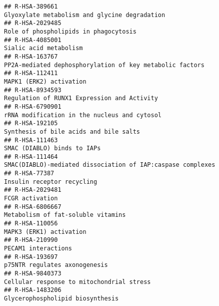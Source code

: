 \documentclass[
]{article}
\begin{document}
\begin{verbatim}
## R-HSA-389661                                                                                         Glyoxylate metabolism and glycine degradation
## R-HSA-2029485                                                                                                Role of phospholipids in phagocytosis
## R-HSA-4085001                                                                                                               Sialic acid metabolism
## R-HSA-163767                                                                              PP2A-mediated dephosphorylation of key metabolic factors
## R-HSA-112411                                                                                                               MAPK1 (ERK2) activation
## R-HSA-8934593                                                                                          Regulation of RUNX1 Expression and Activity
## R-HSA-6790901                                                                                         rRNA modification in the nucleus and cytosol
## R-HSA-192105                                                                                                Synthesis of bile acids and bile salts
## R-HSA-111463                                                                                                          SMAC (DIABLO) binds to IAPs 
## R-HSA-111464                                                                          SMAC(DIABLO)-mediated dissociation of IAP:caspase complexes 
## R-HSA-77387                                                                                                             Insulin receptor recycling
## R-HSA-2029481                                                                                                                      FCGR activation
## R-HSA-6806667                                                                                                   Metabolism of fat-soluble vitamins
## R-HSA-110056                                                                                                               MAPK3 (ERK1) activation
## R-HSA-210990                                                                                                                   PECAM1 interactions
## R-HSA-193697                                                                                                         p75NTR regulates axonogenesis
## R-HSA-9840373                                                                                            Cellular response to mitochondrial stress
## R-HSA-1483206                                                                                                     Glycerophospholipid biosynthesis

\end{verbatim}
\end{document}
